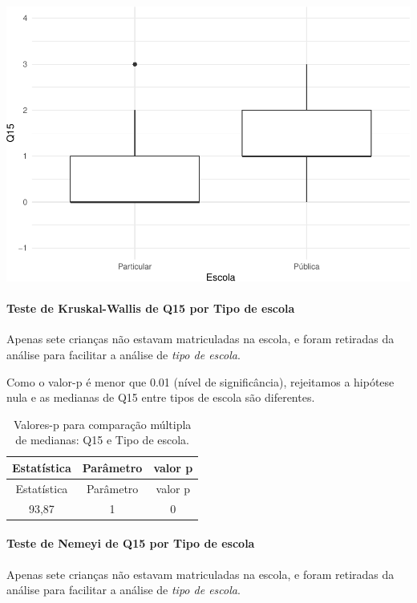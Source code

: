 \documentclass[]{article}
\let\oldparagraph\paragraph
\renewcommand{\paragraph}[1]{\oldparagraph{#1}\mbox{}}
\begin{document}
\begin{center}\includegraphics[width=0.75\linewidth]{relatorio_covid19_files/figure-latex/unnamed-chunk-116-1} \end{center}

\hypertarget{teste-de-kruskal-wallis-de-q15-por-tipo-de-escola}{%
\paragraph{Teste de Kruskal-Wallis de Q15 por Tipo de escola}\label{teste-de-kruskal-wallis-de-q15-por-tipo-de-escola}}

Apenas sete crianças não estavam matriculadas na escola, e foram retiradas da análise para facilitar a análise de \emph{tipo de escola}.

Como o valor-p é menor que 0.01 (nível de significância), rejeitamos a hipótese nula e as medianas de Q15 entre tipos de escola são diferentes.

\begin{longtable}[]{@{}ccc@{}}
\caption{\label{tab:unnamed-chunk-118}Valores-p para comparação múltipla de medianas: Q15 e Tipo de escola.}\tabularnewline
\toprule
Estatística & Parâmetro & valor p\tabularnewline
\midrule
\endfirsthead
\toprule
Estatística & Parâmetro & valor p\tabularnewline
\midrule
\endhead
93,87 & 1 & 0\tabularnewline
\bottomrule
\end{longtable}

\hypertarget{teste-de-nemeyi-de-q15-por-tipo-de-escola}{%
\paragraph{Teste de Nemeyi de Q15 por Tipo de escola}\label{teste-de-nemeyi-de-q15-por-tipo-de-escola}}

Apenas sete crianças não estavam matriculadas na escola, e foram retiradas da análise para facilitar a análise de \emph{tipo de escola}.
\end{document}
